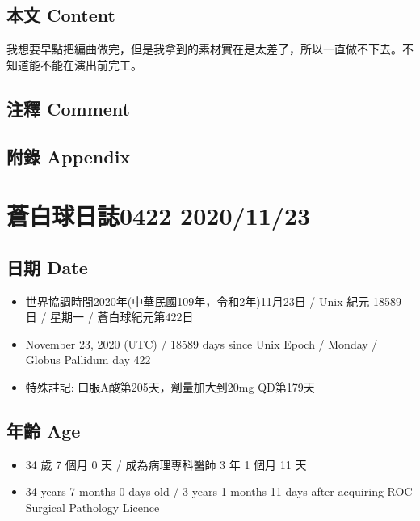 \documentclass[
]{article}
\providecommand{\tightlist}{%
  \setlength{\itemsep}{0pt}\setlength{\parskip}{0pt}}
\begin{document}
\hypertarget{ux672cux6587-content-73}{%
\subsection{本文 Content}\label{ux672cux6587-content-73}}

我想要早點把編曲做完，但是我拿到的素材實在是太差了，所以一直做不下去。不知道能不能在演出前完工。

\hypertarget{ux6ce8ux91cb-comment-73}{%
\subsection{注釋 Comment}\label{ux6ce8ux91cb-comment-73}}

\hypertarget{ux9644ux9304-appendix-73}{%
\subsection{附錄 Appendix}\label{ux9644ux9304-appendix-73}}

\hypertarget{ux84bcux767dux7403ux65e5ux8a8c0422-20201123}{%
\section{蒼白球日誌0422
2020/11/23}\label{ux84bcux767dux7403ux65e5ux8a8c0422-20201123}}

\hypertarget{ux65e5ux671f-date-74}{%
\subsection{日期 Date}\label{ux65e5ux671f-date-74}}

\begin{itemize}
\tightlist
\item
  世界協調時間2020年(中華民國109年，令和2年)11月23日 / Unix 紀元 18589
  日 / 星期一 / 蒼白球紀元第422日
\item
  November 23, 2020 (UTC) / 18589 days since Unix Epoch / Monday /
  Globus Pallidum day 422
\item
  特殊註記: 口服A酸第205天，劑量加大到20mg QD第179天
\end{itemize}

\hypertarget{ux5e74ux9f61-age-74}{%
\subsection{年齡 Age}\label{ux5e74ux9f61-age-74}}

\begin{itemize}
\tightlist
\item
  34 歲 7 個月 0 天 / 成為病理專科醫師 3 年 1 個月 11 天
\item
  34 years 7 months 0 days old / 3 years 1 months 11 days after
  acquiring ROC Surgical Pathology Licence
\end{itemize}
\end{document}
